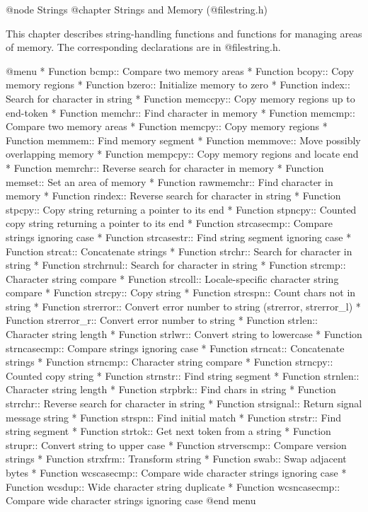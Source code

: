 @node Strings
@chapter Strings and Memory (@file{string.h})

This chapter describes string-handling functions and functions for
managing areas of memory.  The corresponding declarations are in
@file{string.h}.

@menu
* Function bcmp::        Compare two memory areas
* Function bcopy::       Copy memory regions
* Function bzero::       Initialize memory to zero
* Function index::       Search for character in string
* Function memccpy::     Copy memory regions up to end-token
* Function memchr::      Find character in memory
* Function memcmp::      Compare two memory areas
* Function memcpy::      Copy memory regions
* Function memmem::      Find memory segment
* Function memmove::     Move possibly overlapping memory
* Function mempcpy::     Copy memory regions and locate end
* Function memrchr::     Reverse search for character in memory
* Function memset::      Set an area of memory
* Function rawmemchr::   Find character in memory
* Function rindex::      Reverse search for character in string
* Function stpcpy::      Copy string returning a pointer to its end
* Function stpncpy::     Counted copy string returning a pointer to its end
* Function strcasecmp::  Compare strings ignoring case
* Function strcasestr::  Find string segment ignoring case
* Function strcat::      Concatenate strings
* Function strchr::      Search for character in string
* Function strchrnul::   Search for character in string
* Function strcmp::      Character string compare
* Function strcoll::     Locale-specific character string compare
* Function strcpy::      Copy string
* Function strcspn::     Count chars not in string
* Function strerror::    Convert error number to string (strerror, strerror_l)
* Function strerror_r::  Convert error number to string
* Function strlen::      Character string length
* Function strlwr::      Convert string to lowercase
* Function strncasecmp:: Compare strings ignoring case
* Function strncat::     Concatenate strings
* Function strncmp::     Character string compare
* Function strncpy::     Counted copy string
* Function strnstr::     Find string segment
* Function strnlen::     Character string length
* Function strpbrk::     Find chars in string
* Function strrchr::     Reverse search for character in string
* Function strsignal::   Return signal message string
* Function strspn::      Find initial match
* Function strstr::      Find string segment
* Function strtok::      Get next token from a string
* Function strupr::      Convert string to upper case
* Function strverscmp::  Compare version strings
* Function strxfrm::     Transform string
* Function swab::        Swap adjacent bytes
* Function wcscasecmp::  Compare wide character strings ignoring case
* Function wcsdup::      Wide character string duplicate
* Function wcsncasecmp:: Compare wide character strings ignoring case
@end menu

